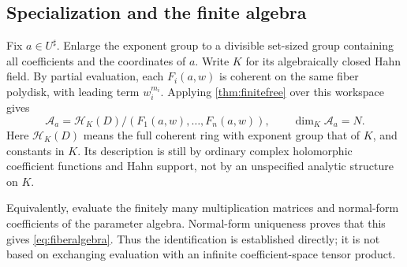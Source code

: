 \documentclass[11pt,oneside]{article}
\numberwithin{equation}{section}
\theoremstyle{definition}
\theoremstyle{remark}\newtheorem{remark}[theorem]{Remark}
\newcommand{\sh}{^{\sharp}}
\begin{document}
\subsection{Specialization and the finite algebra}
Fix \(a\in U\sh\). Enlarge the exponent group to a divisible set-sized group containing all coefficients and the coordinates of \(a\). Write \(K\) for its algebraically closed Hahn field. By partial evaluation, each \(F_i(a,w)\) is coherent on the same fiber polydisk, with leading term \(w_i^{m_i}\). Applying \cref{thm:finitefree} over this workspace gives
\begin{equation}\label{eq:fiberalgebra}
 \mathcal A_a=
 \mathcal H_K(D)/(F_1(a,w),\ldots,F_n(a,w)),
 \qquad \dim_K\mathcal A_a=N.
\end{equation}
Here \(\mathcal H_K(D)\) means the full coherent ring with exponent group that of \(K\), and constants in \(K\). Its description is still by ordinary complex holomorphic coefficient functions and Hahn support, not by an unspecified analytic structure on \(K\).

Equivalently, evaluate the finitely many multiplication matrices and normal-form coefficients of the parameter algebra. Normal-form uniqueness proves that this gives \eqref{eq:fiberalgebra}. Thus the identification is established directly; it is not based on exchanging evaluation with an infinite coefficient-space tensor product.
\end{document}
